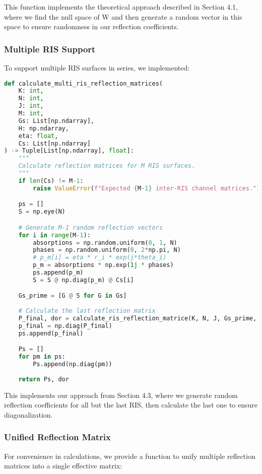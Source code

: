 This function implements the theoretical approach described in Section 4.1, where we find the null space of W and then generate a random vector in this space to ensure randomness in our reflection coefficients.

\subsubsection{Multiple RIS Support}

To support multiple RIS surfaces in series, we implemented:

\begin{lstlisting}[language=python, caption={Multiple RIS calculation}]
def calculate_multi_ris_reflection_matrices(
    K: int, 
    N: int, 
    J: int, 
    M: int,
    Gs: List[np.ndarray], 
    H: np.ndarray, 
    eta: float,
    Cs: List[np.ndarray]
) -> Tuple[List[np.ndarray], float]:
    """
    Calculate reflection matrices for M RIS surfaces.
    """
    if len(Cs) != M-1:
        raise ValueError(f"Expected {M-1} inter-RIS channel matrices.")

    ps = []
    S = np.eye(N)

    # Generate M-1 random reflection vectors
    for i in range(M-1):
        absorptions = np.random.uniform(0, 1, N)
        phases = np.random.uniform(0, 2*np.pi, N)
        # p_m[i] = eta * r_i * exp(j*theta_i)
        p_m = absorptions * np.exp(1j * phases)
        ps.append(p_m)
        S = S @ np.diag(p_m) @ Cs[i]

    Gs_prime = [G @ S for G in Gs]
    
    # Calculate the last reflection matrix
    P_final, dor = calculate_ris_reflection_matrice(K, N, J, Gs_prime, H, eta)
    p_final = np.diag(P_final)
    ps.append(p_final)

    Ps = []
    for pm in ps:
        Ps.append(np.diag(pm))
    
    return Ps, dor
\end{lstlisting}

This implements our approach from Section 4.3, where we generate random reflection coefficients for all but the last RIS, then calculate the last one to ensure diagonalization.

\subsubsection{Unified Reflection Matrix}

For convenience in calculations, we provide a function to unify multiple reflection matrices into a single effective matrix:

